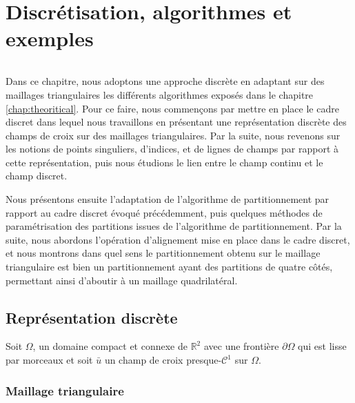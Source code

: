 \chapter{Discrétisation, algorithmes et exemples}
\label{chap:alorithme}
\minitoc

\[\]

Dans ce chapitre, nous adoptons une approche discrète en adaptant sur des maillages triangulaires les différents algorithmes exposés dans le chapitre \ref{chap:theoritical}. Pour ce faire, nous commençons par mettre en place le cadre discret dans lequel nous travaillons en présentant une représentation discrète des champs de croix sur des maillages triangulaires. Par la suite, nous revenons sur les notions de points singuliers, d'indices, et de lignes de champs par rapport à cette représentation, puis nous étudions le lien entre le champ continu et le champ discret.

Nous présentons ensuite l'adaptation de l'algorithme de partitionnement par rapport au cadre discret évoqué précédemment, puis quelques méthodes de paramétrisation des partitions issues de l'algorithme de partitionnement. Par la suite, nous abordons l'opération d'alignement mise en place dans le cadre discret, et nous montrons dans quel sens le partitionnement obtenu sur le maillage triangulaire est bien un partitionnement ayant des partitions de quatre côtés, permettant ainsi d'aboutir à un maillage quadrilatéral.

\section{Représentation discrète}
\label{sec:repr_discrete}

Soit $\Omega$, un domaine compact et connexe de $\mathbb{R}^2$ avec une frontière $\partial\Omega$ qui est lisse par morceaux et soit $\bar{u}$ un champ de croix presque-$\mathcal{C}^1$ sur $\Omega$.

\subsection{Maillage triangulaire}
\label{subsec:mesh_tri}


